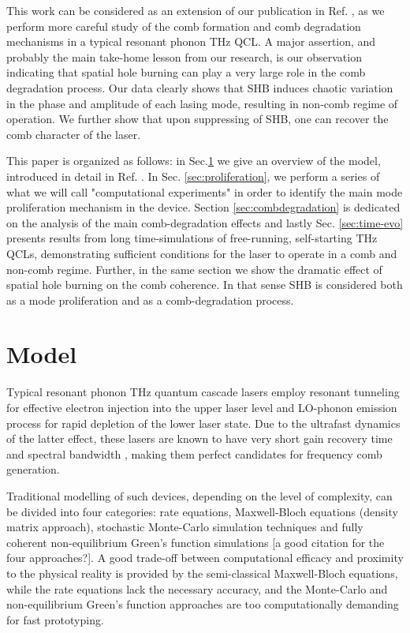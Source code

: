 \documentclass[journal]{IEEEtran}
\begin{document}
This work can be considered as an extension of our publication in Ref. \cite{petz2016}, as we perform more careful study of the comb formation and comb degradation mechanisms in a typical resonant phonon THz QCL. A major assertion, and probably the main take-home lesson from our research, is our observation indicating that spatial hole burning can play a very large role in the comb degradation process. Our data clearly shows that SHB induces chaotic variation in the phase and amplitude of each lasing mode, resulting in non-comb regime of operation. We further show that upon suppressing of SHB, one can recover the comb character of the laser.  

This paper is organized as follows: in Sec.\ref{sec:theory} we give an overview of the model, introduced in detail in Ref. \cite{petz2016}. In Sec. \ref{sec:proliferation}, we perform a series of what we will call "computational experiments" in order to identify the main mode proliferation mechanism in the device. Section \ref{sec:combdegradation} is dedicated on the analysis of the main comb-degradation effects and lastly Sec. \ref{sec:time-evo} presents results from long time-simulations of free-running, self-starting THz QCLs, demonstrating sufficient conditions for the laser to operate in a comb and non-comb regime. Further, in the same section we show the dramatic effect of spatial hole burning on the comb coherence. In that sense SHB is considered both as a mode proliferation and as a comb-degradation process.

\section{Model}
\label{sec:theory}
Typical resonant phonon THz quantum cascade lasers employ resonant tunneling for effective electron injection into the upper laser level and LO-phonon emission process for rapid depletion of the lower laser state. Due to the ultrafast dynamics of the latter effect, these lasers are known to have very short gain recovery time and spectral bandwidth \cite{wang2015generating}, making them perfect candidates for frequency comb generation. 

Traditional modelling of such devices, depending on the level of complexity, can be divided into four categories: rate equations, Maxwell-Bloch equations (density matrix approach), stochastic Monte-Carlo simulation techniques and fully coherent non-equilibrium Green's function simulations \cite{jirauschek2014modeling} [a good citation for the four approaches?]. A good trade-off between computational efficacy and proximity to the physical reality is provided by the semi-classical Maxwell-Bloch equations, while the rate equations lack the necessary accuracy, and the Monte-Carlo and non-equilibrium Green's function approaches are too computationally demanding for fast prototyping.
\end{document}
